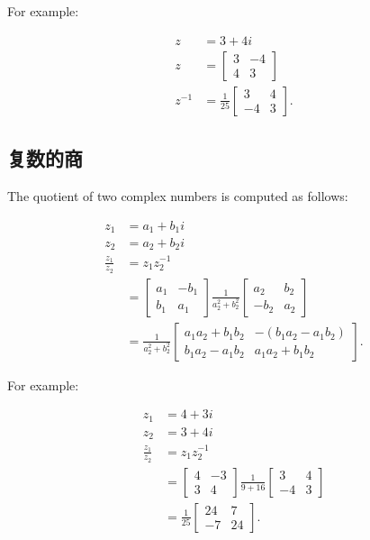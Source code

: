 For example:

$$
\begin{aligned}
z & =3+4 i \\
z & =\left[\begin{array}{cc}
3 & -4 \\
4 & 3
\end{array}\right] \\
z^{-1} & =\frac{1}{25}\left[\begin{array}{cc}
3 & 4 \\
-4 & 3
\end{array}\right] .
\end{aligned}
$$

\subsection{复数的商}
The quotient of two complex numbers is computed as follows:

$$
\begin{aligned}
z_{1} & =a_{1}+b_{1} i \\
z_{2} & =a_{2}+b_{2} i \\
\frac{z_{1}}{z_{2}} & =z_{1} z_{2}^{-1} \\
& =\left[\begin{array}{cc}
a_{1} & -b_{1} \\
b_{1} & a_{1}
\end{array}\right] \frac{1}{a_{2}^{2}+b_{2}^{2}}\left[\begin{array}{cc}
a_{2} & b_{2} \\
-b_{2} & a_{2}
\end{array}\right] \\
& =\frac{1}{a_{2}^{2}+b_{2}^{2}}\left[\begin{array}{cc}
a_{1} a_{2}+b_{1} b_{2} & -\left(b_{1} a_{2}-a_{1} b_{2}\right) \\
b_{1} a_{2}-a_{1} b_{2} & a_{1} a_{2}+b_{1} b_{2}
\end{array}\right] .
\end{aligned}
$$

For example:

$$
\begin{aligned}
z_{1} & =4+3 i \\
z_{2} & =3+4 i \\
\frac{z_{1}}{z_{2}} & =z_{1} z_{2}^{-1} \\
& =\left[\begin{array}{cc}
4 & -3 \\
3 & 4
\end{array}\right] \frac{1}{9+16}\left[\begin{array}{cc}
3 & 4 \\
-4 & 3
\end{array}\right] \\
& =\frac{1}{25}\left[\begin{array}{cc}
24 & 7 \\
-7 & 24
\end{array}\right] .
\end{aligned}
$$

